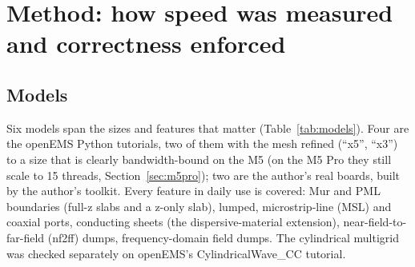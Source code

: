 \section{Method: how speed was measured and correctness enforced}\label{sec:method}

\subsection{Models}
Six models span the sizes and features that matter (Table~\ref{tab:models}). Four are the openEMS Python tutorials,
two of them with the mesh refined (``x5'', ``x3'') to a size that is clearly bandwidth-bound on the M5 (on the M5 Pro they still scale to 15 threads, Section~\ref{sec:m5pro}); two are the author's
real boards, built by the author's toolkit. Every feature in daily use is covered: Mur and PML boundaries (full-z slabs
and a z-only slab), lumped, microstrip-line (MSL) and coaxial ports, conducting sheets (the dispersive-material
extension), near-field-to-far-field (nf2ff) dumps, frequency-domain field dumps. The cylindrical multigrid was checked
separately on openEMS's CylindricalWave\_CC tutorial.

